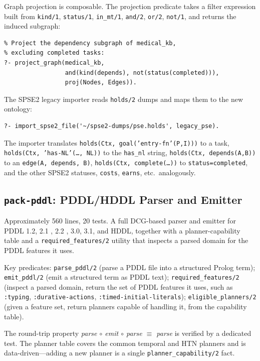 \documentclass[11pt,letterpaper]{article}
\begin{document}
Graph projection is composable. The projection predicate takes a filter
expression built from \texttt{kind/1}, \texttt{status/1},
\texttt{in\_mt/1}, \texttt{and/2}, \texttt{or/2}, \texttt{not/1}, and
returns the induced subgraph:

\begin{lstlisting}
% Project the dependency subgraph of medical_kb,
% excluding completed tasks:
?- project_graph(medical_kb,
                 and(kind(depends), not(status(completed))),
                 proj(Nodes, Edges)).
\end{lstlisting}

The SPSE2 legacy importer reads \texttt{holds/2} dumps and maps them to
the new ontology:

\begin{lstlisting}
?- import_spse2_file('~/spse2-dumps/pse.holds', legacy_pse).
\end{lstlisting}

The importer translates \texttt{holds(Ctx, goal('entry-fn'(P,I)))} to a
task, \texttt{holds(Ctx, 'has-NL'(\ldots, NL))} to the \texttt{has\_nl}
string, \texttt{holds(Ctx, depends(A,B))} to an \texttt{edge(A, depends,
B)}, \texttt{holds(Ctx, complete(\ldots))} to \texttt{status=completed},
and the other SPSE2 statuses, \texttt{costs}, \texttt{earns}, etc.\
analogously.

\subsection{\texttt{pack-pddl}: PDDL/HDDL Parser and Emitter}
\label{sec:pddl}

Approximately 560 lines, 20 tests. A full DCG-based parser and emitter for
PDDL 1.2, 2.1 \citep{fox-long-pddl21-2003}, 2.2 \citep{edelkamp-pddl22-2004},
3.0, 3.1, and HDDL, together with a
planner-capability table and a \texttt{required\_features/2} utility that
inspects a parsed domain for the PDDL features it uses.

Key predicates: \texttt{parse\_pddl/2} (parse a PDDL file into a structured
Prolog term); \texttt{emit\_pddl/2} (emit a structured term as PDDL text);
\texttt{required\_features/2} (inspect a parsed domain, return the set of
PDDL features it uses, such as \texttt{:typing},
\texttt{:durative-actions}, \texttt{:timed-initial-literals});
\texttt{eligible\_planners/2} (given a feature set, return planners capable
of handling it, from the capability table).

The round-trip property \emph{parse $\circ$ emit $\circ$ parse $\equiv$
parse} is verified by a dedicated test. The planner table covers the
common temporal and HTN planners and is data-driven---adding a new planner
is a single \texttt{planner\_capability/2} fact.
\end{document}

